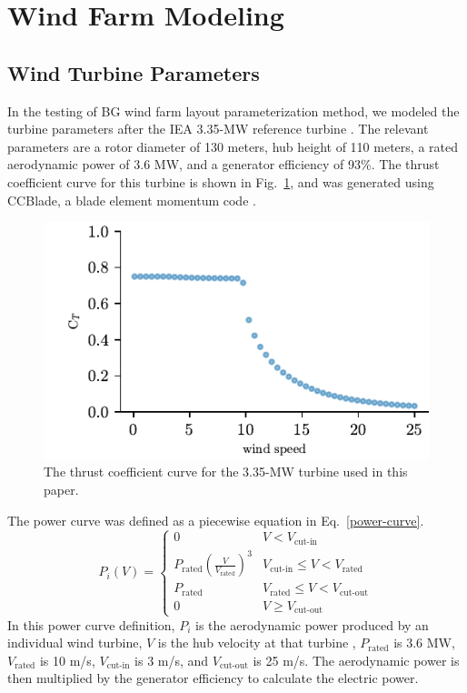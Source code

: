 \documentclass[wes, manuscript]{copernicus}
\begin{document}
\section{Wind Farm Modeling}
\subsection{Wind Turbine Parameters}
In the testing of BG wind farm layout parameterization method, we modeled the turbine parameters after the IEA 3.35-MW reference turbine \citep{iea}.
The relevant parameters are a rotor diameter of 130 meters, hub height of 110 meters, a rated aerodynamic power of 3.6 MW, and a generator efficiency of 93\%. The thrust coefficient curve for this turbine is shown in Fig.~\ref{fig:ct}, and was generated using CCBlade, a blade element momentum code \citep{ning2013ccblade}.
%
\begin{figure}
\centering
\includegraphics{paper-figures/ct_curve.pdf}
\caption{The thrust coefficient curve for the 3.35-MW turbine used in this paper.}
\label{fig:ct}
\end{figure}
%
The power curve was defined as a piecewise equation in Eq.~\ref{power-curve}.
%
\begin{equation}
                P_i(V) = 
                \begin{cases} 
                    0 & V < V_{\text{cut-in}} \\
                    P_{\text{rated}}(\frac{V}{V_{\text{rated}}})^3 & V_{\text{cut-in}}\leq V < V_{\text{rated}} \\
                    P_{\text{rated}} & V_{\text{rated}} \leq V < V_{\text{cut-out}} \\
                    0 & V \geq V_{\text{cut-out}}
                \end{cases}
            \label{power-curve}
\end{equation}
%
In this power curve definition, $P_i$ is the aerodynamic power produced by an individual wind turbine, $V$ is the hub velocity at that turbine \citep{lackner2007analytical,chen2015multi,park2015layout}, $P_{\text{rated}}$ is 3.6 MW, $V_{\text{rated}}$ is 10 m/s, $V_{\text{cut-in}}$ is 3 m/s, and $V_{\text{cut-out}}$ is 25 m/s. The aerodynamic power is then multiplied by the generator efficiency to calculate the electric power.
\end{document}
